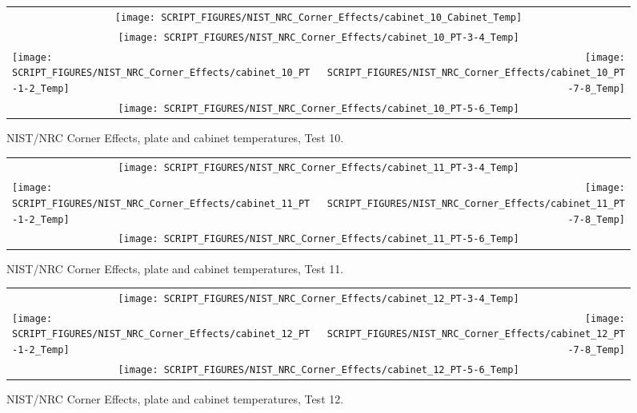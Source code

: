 \begin{figure}[p]
\begin{tabular*}{\textwidth}{l@{\extracolsep{\fill}}r}
\multicolumn{2}{c}{\texttt{[image: SCRIPT\_FIGURES/NIST\_NRC\_Corner\_Effects/cabinet\_10\_Cabinet\_Temp]}} \\
\multicolumn{2}{c}{\texttt{[image: SCRIPT\_FIGURES/NIST\_NRC\_Corner\_Effects/cabinet\_10\_PT-3-4\_Temp]}} \\
\texttt{[image: SCRIPT\_FIGURES/NIST\_NRC\_Corner\_Effects/cabinet\_10\_PT-1-2\_Temp]} &
\texttt{[image: SCRIPT\_FIGURES/NIST\_NRC\_Corner\_Effects/cabinet\_10\_PT-7-8\_Temp]} \\
\multicolumn{2}{c}{\texttt{[image: SCRIPT\_FIGURES/NIST\_NRC\_Corner\_Effects/cabinet\_10\_PT-5-6\_Temp]}}
\end{tabular*}
\caption[NIST/NRC Corner Effects, plate and cabinet temperatures, Test 10]{NIST/NRC Corner Effects, plate and cabinet temperatures, Test 10.}
\label{NIST_NRC_Cabinet_PT_Test_10}
\end{figure}

\begin{figure}[p]
\begin{tabular*}{\textwidth}{l@{\extracolsep{\fill}}r}
\multicolumn{2}{c}{\texttt{[image: SCRIPT\_FIGURES/NIST\_NRC\_Corner\_Effects/cabinet\_11\_PT-3-4\_Temp]}} \\
\texttt{[image: SCRIPT\_FIGURES/NIST\_NRC\_Corner\_Effects/cabinet\_11\_PT-1-2\_Temp]} &
\texttt{[image: SCRIPT\_FIGURES/NIST\_NRC\_Corner\_Effects/cabinet\_11\_PT-7-8\_Temp]} \\
\multicolumn{2}{c}{\texttt{[image: SCRIPT\_FIGURES/NIST\_NRC\_Corner\_Effects/cabinet\_11\_PT-5-6\_Temp]}}
\end{tabular*}
\caption[NIST/NRC Corner Effects, plate and cabinet temperatures, Test 11]{NIST/NRC Corner Effects, plate and cabinet temperatures, Test 11.}
\label{NIST_NRC_Cabinet_PT_Test_11}
\end{figure}

\begin{figure}[p]
\begin{tabular*}{\textwidth}{l@{\extracolsep{\fill}}r}
\multicolumn{2}{c}{\texttt{[image: SCRIPT\_FIGURES/NIST\_NRC\_Corner\_Effects/cabinet\_12\_PT-3-4\_Temp]}} \\
\texttt{[image: SCRIPT\_FIGURES/NIST\_NRC\_Corner\_Effects/cabinet\_12\_PT-1-2\_Temp]} &
\texttt{[image: SCRIPT\_FIGURES/NIST\_NRC\_Corner\_Effects/cabinet\_12\_PT-7-8\_Temp]} \\
\multicolumn{2}{c}{\texttt{[image: SCRIPT\_FIGURES/NIST\_NRC\_Corner\_Effects/cabinet\_12\_PT-5-6\_Temp]}}
\end{tabular*}
\caption[NIST/NRC Corner Effects, plate and cabinet temperatures, Test 12]{NIST/NRC Corner Effects, plate and cabinet temperatures, Test 12.}
\label{NIST_NRC_Cabinet_PT_Test_12}
\end{figure}


